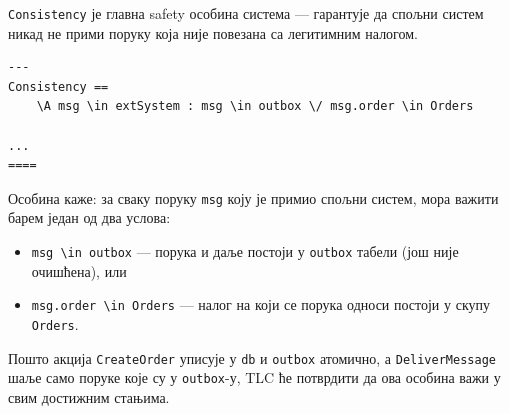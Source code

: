 \begin{primer}
\texttt{Consistency} је главна safety особина система --- гарантује да спољни систем никад не прими поруку која није повезана са легитимним налогом.
\begin{lstlisting}
---
Consistency ==
    \A msg \in extSystem : msg \in outbox \/ msg.order \in Orders

...
====
\end{lstlisting}
Особина каже: за сваку поруку \texttt{msg} коју је примио спољни систем, мора важити барем један од два услова:
\begin{itemize}
    \item \texttt{msg \textbackslash in outbox} --- порука и даље постоји у \texttt{outbox} табели (још није очишћена), или
    \item \texttt{msg.order \textbackslash in Orders} --- налог на који се порука односи постоји у скупу \texttt{Orders}.
\end{itemize}
Пошто акција \texttt{CreateOrder} уписује у \texttt{db} и \texttt{outbox} атомично, а \texttt{DeliverMessage} шаље
само поруке које су у \texttt{outbox}-у, TLC ће потврдити да ова особина важи у свим достижним стањима.

\end{primer}
